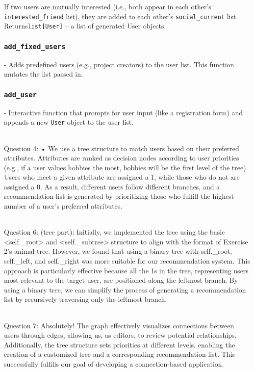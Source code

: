 \documentclass[fontsize=11pt]{article}
\begin{document}
If two users are mutually interested (i.e., both appear in each other's \texttt{interested\_friend} list), they are added to each other's \texttt{social\_current} list. Returns\texttt{list[User]} – a list of generated User objects.

\subsubsection*{\texttt{add\_fixed\_users}}
- Adds predefined users (e.g., project creators) to the user list. This function mutates the list passed in.

\subsubsection*{\texttt{add\_user}}
- Interactive function that prompts for user input (like a registration form) and appends a new \texttt{User} object to the user list.

\\ 
Question 4: 
	• We use a tree structure to match users based on their preferred attributes. Attributes are ranked as decision nodes according to user priorities (e.g., if a user values hobbies the most, hobbies will be the first level of the tree). Users who meet a given attribute are assigned a 1, while those who do not are assigned a 0. As a result, different users follow different branches, and a recommendation list is generated by prioritizing those who fulfill the highest number of a user's preferred attributes.



\\
Question 6: 
(tree part): Initially, we implemented the tree using the basic <self._root> and <self._subtree> structure to align with the format of Exercise 2's animal tree. However, we found that using a binary tree with self._root, self._left, and self._right was more suitable for our recommendation system. This approach is particularly effective because all the 1s in the tree, representing users most relevant to the target user, are positioned along the leftmost branch. By using a binary tree, we can simplify the process of generating a recommendation list by recursively traversing only the leftmost branch.


\\
Question 7:
Absolutely! The graph effectively visualizes connections between users through edges, allowing us, as editors, to review potential relationships. Additionally, the tree structure sets priorities at different levels, enabling the creation of a customized tree and a corresponding recommendation list. This successfully fulfills our goal of developing a connection-based application.
\end{document}
